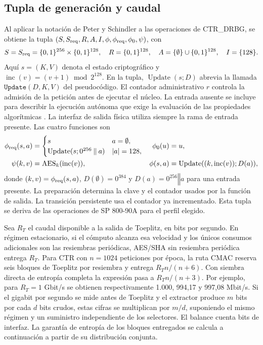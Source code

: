 \documentclass[11pt,a4paper]{article}
\newcommand{\Enc}{\operatorname{AES}}
\newcommand{\bits}{\{0,1\}}
\newcommand{\cat}{\mathbin\Vert}
\newcommand{\upd}{\operatorname{Update}}
\begin{document}
\subsection{Tupla de generación y caudal}
Al aplicar la notación de Peter y Schindler \cite[párr.~129, ec.~(3.1)]{ais} a las operaciones de CTR\_DRBG, se obtiene la tupla
\((S,S_{\rm req},R,A,I,\phi,\phi_{\rm req},\phi_0,\psi)\), con
\[
 S=S_{\rm req}=\bits^{256}\times\bits^{128},\quad R=\bits^{128},\quad
 A=\{\emptyset\}\cup\bits^{128},\quad I=\{128\}.
\]
Aquí \(s=(K,V)\) denota el estado criptográfico y \(\operatorname{inc}(v)=(v+1)\bmod 2^{128}\). En la tupla, \(\upd(s;D)\) abrevia la llamada \(\texttt{Update}(D,K,V)\) del pseudocódigo. El contador administrativo \(r\) controla la admisión de la petición antes de ejecutar el núcleo. La entrada ausente se incluye para describir la ejecución autónoma que exige la evaluación de las propiedades algorítmicas \cite[párr.~211]{ais}. La interfaz de salida física utiliza siempre la rama de entrada presente. Las cuatro funciones son
\begin{align*}
 \phi_{\rm req}(s,a)&=
 \begin{cases}s & a=\emptyset,\\
 \upd(s;0^{256}\cat a)& |a|=128,\end{cases}
 &\phi_0(u)&=u,\\
 \psi(k,v)&=\Enc_k(\operatorname{inc}(v)),&
 \phi(s,a)&=\upd((k,\operatorname{inc}(v));D(a)),
\end{align*}
donde \((k,v)=\phi_{\rm req}(s,a)\), \(D(\emptyset)=0^{384}\) y \(D(a)=0^{256}\cat a\) para una entrada presente. La preparación determina la clave y el contador usados por la función de salida. La transición persistente usa el contador ya incrementado. Esta tupla se deriva de las operaciones de SP 800-90A para el perfil elegido.

Sea \(R_T\) el caudal disponible a la salida de Toeplitz, en bits por segundo. En régimen estacionario, si el cómputo alcanza esa velocidad y los únicos consumos adicionales son las resiembras periódicas, AES/SHA sin resiembra periódica entrega \(R_T\). Para CTR con \(n=1024\) peticiones por época, la ruta CMAC reserva seis bloques de Toeplitz por resiembra y entrega \(R_T n/(n+6)\). Con siembra directa de entropía completa la expresión pasa a \(R_T n/(n+3)\). Por ejemplo, para \(R_T=1\) Gbit/s se obtienen respectivamente 1.000, 994,17 y 997,08 Mbit/s. Si el gigabit por segundo se mide antes de Toeplitz y el extractor produce \(m\) bits por cada \(d\) bits crudos, estas cifras se multiplican por \(m/d\), suponiendo el mismo régimen y un suministro independiente de los selectores. El balance cuenta bits de interfaz. La garantía de entropía de los bloques entregados se calcula a continuación a partir de su distribución conjunta.
\end{document}

